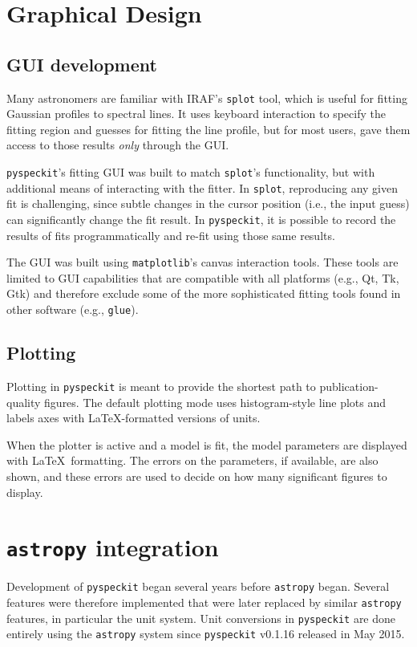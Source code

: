 \documentclass[twocolumn]{aastex62}
\newcommand{\pyspeckit}{\texttt{pyspeckit}\xspace}
\newcommand{\astropy}{\texttt{astropy}\xspace}
\begin{document}
\section{Graphical Design}
\label{sec:gui}
\subsection{GUI development}
Many astronomers are familiar with IRAF's \texttt{splot} tool, which is useful
for fitting Gaussian profiles to spectral lines.  It uses keyboard interaction
to specify the fitting region and guesses for fitting the line profile, but for
most users, gave them access to those results \emph{only} through the GUI.

\texttt{pyspeckit}'s fitting GUI was built to match \texttt{splot}'s
functionality, but with additional means of interacting with the fitter.  In
\texttt{splot}, reproducing any given fit is challenging, since subtle changes
in the cursor position (i.e., the input guess) can significantly change the fit
result.  In \pyspeckit, it is possible to record the results of fits
programmatically and re-fit using those same results.

The GUI was built using \texttt{matplotlib}'s canvas interaction tools.  These
tools are limited to GUI capabilities that are compatible with all platforms
(e.g., Qt, Tk, Gtk) and therefore exclude some of the more sophisticated fitting
tools found in other software (e.g., \texttt{glue}).

\subsection{Plotting}
Plotting in \pyspeckit is meant to provide the shortest path to
publication-quality figures.  The default plotting mode uses histogram-style
line plots and labels axes with \LaTeX-formatted versions of units.

When the plotter is active and a model is fit, the model parameters are
displayed with \LaTeX~formatting.  The errors on the parameters, if available,
are also shown, and these errors are used to decide on how many significant
figures to display.

\section{\astropy integration}
Development of \pyspeckit began several years before \astropy began.  Several
features were therefore implemented that were later replaced by similar
\astropy features, in particular the unit system.  Unit conversions in
\pyspeckit are done entirely using the \astropy system since \pyspeckit v0.1.16
released in May 2015.
\end{document}
